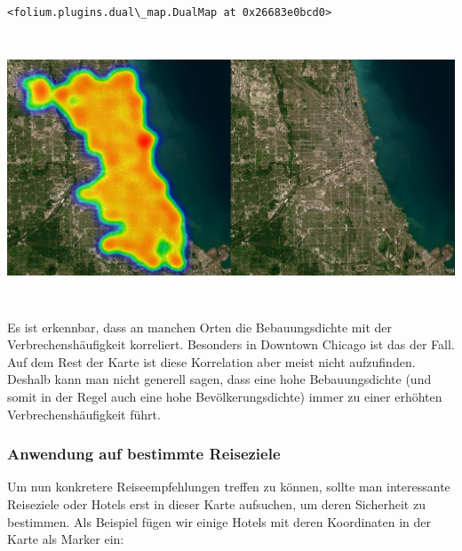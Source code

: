 \documentclass[10pt]{article}
\makeatletter
\newcommand{\boxspacing}{\kern\kvtcb@left@rule\kern\kvtcb@boxsep}
\newcommand{\prompt}[4]{
        {\ttfamily\llap{{\color{#2}[#3]:\hspace{3pt}#4}}\vspace{-\baselineskip}}
    }
\makeatother
\begin{document}
            \begin{tcolorbox}[breakable, size=fbox, boxrule=.5pt, pad at break*=1mm, opacityfill=0]
\prompt{Out}{outcolor}{12}{\boxspacing}
\begin{Verbatim}[commandchars=\\\{\}]
<folium.plugins.dual\_map.DualMap at 0x26683e0bcd0>
\end{Verbatim}
\end{tcolorbox}

\begin{center}
  \includegraphics[height=8cm]{vergleich}
\end{center}
        
    Es ist erkennbar, dass an manchen Orten die Bebauungsdichte mit der
Verbrechenshäufigkeit korreliert. Besonders in Downtown Chicago ist das
der Fall. Auf dem Rest der Karte ist diese Korrelation aber meist nicht
aufzufinden. Deshalb kann man nicht generell sagen, dass eine hohe
Bebauungsdichte (und somit in der Regel auch eine hohe
Bevölkerungsdichte) immer zu einer erhöhten Verbrechenshäufigkeit führt.

    \subsubsection{Anwendung auf bestimmte
Reiseziele}\label{anwendung-auf-bestimmte-reiseziele}

Um nun konkretere Reiseempfehlungen treffen zu können, sollte man
interessante Reiseziele oder Hotels erst in dieser Karte aufsuchen, um
deren Sicherheit zu bestimmen. Als Beispiel fügen wir einige Hotels mit
deren Koordinaten in der Karte als Marker ein:
\ \\
\end{document}
